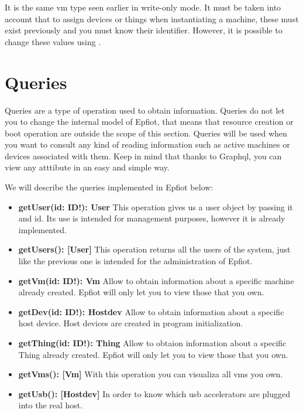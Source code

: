 It is the same vm type seen earlier in write-only mode. It must be taken into account that to assign devices or things when instantiating a machine, these must exist previously and you must know their identifier. However, it is possible to change these values using .

\newpage


\section{Queries}
\label{makereference5.2}

Queries are a type of operation used to obtain information. Queries do not let you to change the internal model of Epfiot, that means that resource creation or boot operation are outside the scope of this section.
Queries will be used when you want to consult any kind of reading information such as active machines or devices associated with them. Keep in mind that thanks to Graphql, you can view any atttibute in an easy and simple way.

We will describe the queries implemented in Epfiot below:


\begin{itemize}
    \item \textbf{getUser(id: ID!): User}\hfill\break
    This operation gives us a user object by passing it and id. Its use is intended for management purposes, however it is already implemented.
    \item \textbf{getUsers(): [User]}\hfill\break
    This operation returns all the users of the system, just like the previous one is intended for the administration of Epfiot.
    \item \textbf{getVm(id: ID!): Vm}\hfill\break
    Allow to obtain information about a specific machine already created. Epfiot will only let you to view those that you own.
    \item \textbf{getDev(id: ID!): Hostdev}\hfill\break
    Allow to obtain information about a specific host device. Host devices are created in program initialization.
    \item \textbf{getThing(id: ID!): Thing}\hfill\break
    Allow to obtaion information about a specific Thing already created. Epfiot will only let you to view those that you own.
    \item \textbf{getVms(): [Vm]}\hfill\break
    With this operation you can visualiza all vms you own.
    \item \textbf{getUsb(): [Hostdev]}\hfill\break
    In order to know which usb accelerators are plugged into the real host.
\end{itemize}

